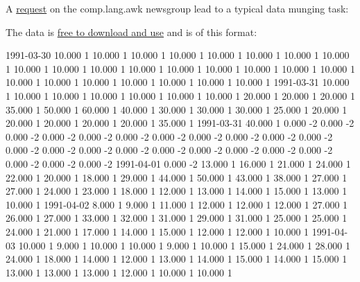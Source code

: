 A
\href{http://groups.google.co.uk/group/comp.lang.awk/msg/0ecba3a3fbf247d8?hl=en}{request}
on the comp.lang.awk newsgroup lead to a typical data munging task:


The data is
\href{http://www.eea.europa.eu/help/eea-help-centre/faqs/how-do-i-obtain-eea-reports}{free
to download and use} and is of this format:

\begin{wideverbatim}
1991-03-30  10.000  1   10.000  1   10.000  1   10.000  1   10.000  1   10.000  1   10.000  1   10.000  1   10.000  1   10.000  1   10.000  1   10.000  1   10.000  1   10.000  1   10.000  1   10.000  1   10.000  1   10.000  1   10.000  1   10.000  1   10.000  1   10.000  1   10.000  1   10.000  1
1991-03-31  10.000  1   10.000  1   10.000  1   10.000  1   10.000  1   10.000  1   10.000  1   20.000  1   20.000  1   20.000  1   35.000  1   50.000  1   60.000  1   40.000  1   30.000  1   30.000  1   30.000  1   25.000  1   20.000  1   20.000  1   20.000  1   20.000  1   20.000  1   35.000  1
1991-03-31  40.000  1   0.000   -2  0.000   -2  0.000   -2  0.000   -2  0.000   -2  0.000   -2  0.000   -2  0.000   -2  0.000   -2  0.000   -2  0.000   -2  0.000   -2  0.000   -2  0.000   -2  0.000   -2  0.000   -2  0.000   -2  0.000   -2  0.000   -2  0.000   -2  0.000   -2  0.000   -2  0.000   -2
1991-04-01  0.000   -2  13.000  1   16.000  1   21.000  1   24.000  1   22.000  1   20.000  1   18.000  1   29.000  1   44.000  1   50.000  1   43.000  1   38.000  1   27.000  1   27.000  1   24.000  1   23.000  1   18.000  1   12.000  1   13.000  1   14.000  1   15.000  1   13.000  1   10.000  1
1991-04-02  8.000   1   9.000   1   11.000  1   12.000  1   12.000  1   12.000  1   27.000  1   26.000  1   27.000  1   33.000  1   32.000  1   31.000  1   29.000  1   31.000  1   25.000  1   25.000  1   24.000  1   21.000  1   17.000  1   14.000  1   15.000  1   12.000  1   12.000  1   10.000  1
1991-04-03  10.000  1   9.000   1   10.000  1   10.000  1   9.000   1   10.000  1   15.000  1   24.000  1   28.000  1   24.000  1   18.000  1   14.000  1   12.000  1   13.000  1   14.000  1   15.000  1   14.000  1   15.000  1   13.000  1   13.000  1   13.000  1   12.000  1   10.000  1   10.000  1
\end{wideverbatim}

